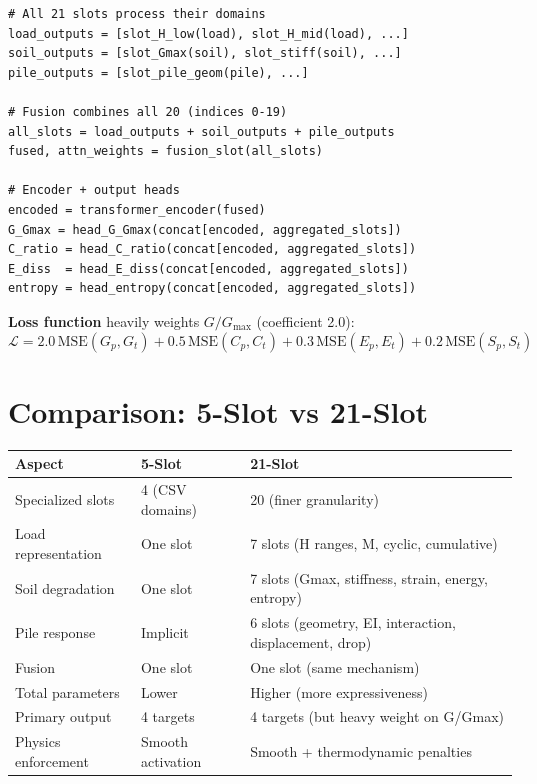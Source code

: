 \documentclass[12pt,a4paper]{article}
\begin{document}
\begin{lstlisting}[caption=Core loop structure]
# All 21 slots process their domains
load_outputs = [slot_H_low(load), slot_H_mid(load), ...]
soil_outputs = [slot_Gmax(soil), slot_stiff(soil), ...]
pile_outputs = [slot_pile_geom(pile), ...]

# Fusion combines all 20 (indices 0-19)
all_slots = load_outputs + soil_outputs + pile_outputs
fused, attn_weights = fusion_slot(all_slots)

# Encoder + output heads
encoded = transformer_encoder(fused)
G_Gmax = head_G_Gmax(concat[encoded, aggregated_slots])
C_ratio = head_C_ratio(concat[encoded, aggregated_slots])
E_diss  = head_E_diss(concat[encoded, aggregated_slots])
entropy = head_entropy(concat[encoded, aggregated_slots])
\end{lstlisting}

\textbf{Loss function} heavily weights $G/G_{\max}$ (coefficient 2.0):
\[
  \mathcal{L} = 2.0 \, \text{MSE}(G_p, G_t) + 0.5 \, \text{MSE}(C_p, C_t) + 0.3 \, \text{MSE}(E_p, E_t) + 0.2 \, \text{MSE}(S_p, S_t)
\]

\section{Comparison: 5-Slot vs 21-Slot}

\begin{table}[h]
\centering
\begin{tabular}{lll}
\toprule
\textbf{Aspect} & \textbf{5-Slot} & \textbf{21-Slot} \\
\midrule
Specialized slots & 4 (CSV domains) & 20 (finer granularity) \\
Load representation & One slot & 7 slots (H ranges, M, cyclic, cumulative) \\
Soil degradation & One slot & 7 slots (Gmax, stiffness, strain, energy, entropy) \\
Pile response & Implicit & 6 slots (geometry, EI, interaction, displacement, drop) \\
Fusion & One slot & One slot (same mechanism) \\
Total parameters & Lower & Higher (more expressiveness) \\
Primary output & 4 targets & 4 targets (but heavy weight on G/Gmax) \\
Physics enforcement & Smooth activation & Smooth + thermodynamic penalties \\
\bottomrule
\end{tabular}
\end{table}
\end{document}
